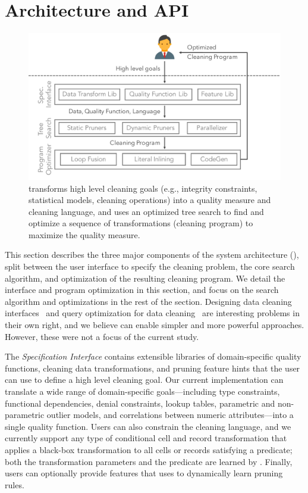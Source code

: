 \section{Architecture and API}
\begin{figure}[t]
\centering
 \includegraphics[width=.8\columnwidth]{ac-experiments/alphacleanarch.pdf}
 \caption{\small \sys transforms high level cleaning goals (e.g., integrity constraints, statistical models, cleaning operations) into a quality measure and cleaning language, and uses an optimized tree search to find and optimize a sequence of transformations (cleaning program) to maximize the quality measure.   \label{fig:arch} }
\end{figure}
This section describes the three major components of the \sys system architecture (), split between the user interface to specify the cleaning problem, the core search algorithm, and optimization of the resulting cleaning program.  We detail the interface and program optimization in this section, and focus on the search algorithm and optimizations in the rest of the section. Designing data cleaning interfaces~\cite{DBLP:conf/uist/GuoKHH11} and query optimization for data cleaning~\cite{DBLP:conf/vldb/GalhardasFSSS01, khayyat2015bigdansing} are interesting problems in their own right, and we believe \sys can enable simpler and more powerful approaches.  However, these were not a focus of the current study.

The {\it Specification Interface} contains extensible libraries of domain-specific quality functions, cleaning data transformations, and pruning feature hints that the user can use to define a high level cleaning goal.  Our current implementation can translate a wide range of domain-specific goals---including type constraints, functional dependencies, denial constraints, lookup tables, parametric and non-parametric outlier models, and correlations between numeric attributes---into a single quality function.  Users can also constrain the cleaning language, and we currently support any type of conditional cell and record transformation that applies a black-box transformation to all cells or records satisfying a predicate; both the transformation parameters and the predicate are learned by \sys.  Finally, users can optionally provide features that \sys uses to dynamically learn pruning rules.

